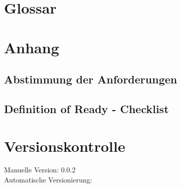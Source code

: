 \documentclass[11pt,titelpage]{scrreprt}
\begin{document}
\section{Glossar}
\listoffigures
\listoftables

\glsaddall
\printglossary
\section{Anhang}

\subsection{Abstimmung der Anforderungen}
\subsection{Definition of Ready - Checklist}
\section{Versionskontrolle}
Manuelle Version: 0.0.2
\\

\noindent
Automatische Versionierung:
%

\immediate{}

\immediate{}
\end{document}
